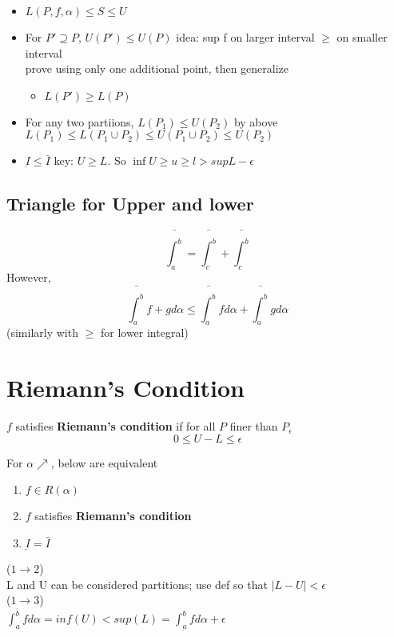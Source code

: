 \documentclass[12pt]{article}
\newcommand{\bt}[1]{\textbf{#1}} %
\newcommand{\gray}[1]{\textcolor[gray]{0.5}{#1}} %
\begin{document}
{\begin{itemize}
    \item $L(P, f, \alpha) \leq S \leq U$
    \item For $P' \supseteq P$, $U(P') \leq U(P)$ 
    \gray{idea: sup f on larger interval $\geq$ on smaller interval}\\
    \gray{prove using only one additional point, then generalize}
    \begin{itemize}
        \item $L(P') \geq L(P)$
    \end{itemize}
    \item For any two partiions, $L(P_1) \leq U(P_2)$
    \gray{by above $L(P_1) \leq L(P_1 \cup P_2) \leq U(P_1 \cup P_2) \leq U(P_2)$}
    \item  $\underbar{I} \leq \bar{I}$ \gray{key: $U \geq L$. So $\inf U \geq u \geq l > sup L - \epsilon$}
\end{itemize}

\subsection*{Triangle for Upper and lower}
$$\bar{\int_a^b} =\bar{\int_c^b} + \bar{\int_c^b}$$ 
However, 
$$\bar{\int_a^b} f + g d \alpha \leq \bar{\int_a^b} f  d \alpha + \bar{\int_a^b} g d \alpha$$ 
(similarly with $\geq$ for lower integral)

\section{Riemann's Condition}
$f$ satisfies \bt{Riemann's condition} if for all $P$ finer than $P_\epsilon$
$$0 \leq U - L \leq \epsilon$$

For $\alpha \nearrow$, below are equivalent
\begin{enumerate}
    \item $f \in R(\alpha)$
    \item $f$ satisfies \bt{Riemann's condition}
    \item $\underbar{I} = \bar{I}$
\end{enumerate}

\gray{($1 \rightarrow 2$)\\
L and U can be considered partitions; use def so that $|L-U|< \epsilon$\\
($1 \rightarrow 3$)\\
$\int_a^{\overline{b}} f d \alpha = inf(U) < sup(L) = \int_{\underbar{a}}^b f d \alpha + \epsilon$
}

}
\end{document}
